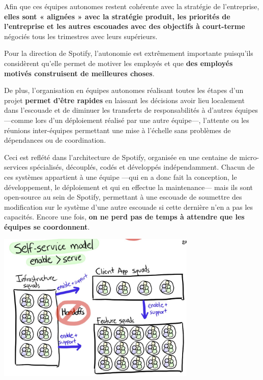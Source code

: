 Afin que ces équipes autonomes restent cohérente avec la stratégie de l'entreprise, \textbf{elles sont « alignées » avec la stratégie produit, les priorités de l’entreprise et les autres escouades avec des objectifs à court-terme} négociés tous les trimestres avec leurs supérieurs.

\vspace{5mm}

Pour la direction de Spotify, l'autonomie est extrêmement importante puisqu'ils considèrent qu'elle permet de motiver les employés et que \textbf{des employés motivés construisent de meilleures choses}.

De plus, l'organisation en équipes autonomes réalisant toutes les étapes d'un projet \textbf{permet d'être rapides} en laissant les décisions avoir lieu localement dans l'escouade et de diminuer les transferts de responsabilités à d’autres équipes ---comme lors d'un déploiement réalisé par une autre équipe---, l’attente ou les réunions inter-équipes permettant une mise à l’échelle sans problèmes de dépendances ou de coordination.

Ceci est reflété dans l'architecture de Spotify, organisée en une centaine de micro-services spécialisés, découplés, codés et développés indépendamment. Chacun de ces systèmes appartient à une équipe ---qui en a donc fait la conception, le développement, le déploiement et qui en effectue la maintenance--- mais ils sont open-source au sein de Spotify, permettant à une escouade de soumettre des modification sur le système d’une autre escouade si cette dernière n’en a pas les capacités. Encore une fois, \textbf{on ne perd pas de temps à attendre que les équipes se coordonnent}.

\newpage

\begin{center}
\includegraphics[width=95mm]{./images_spotify/image03}
\end{center}

